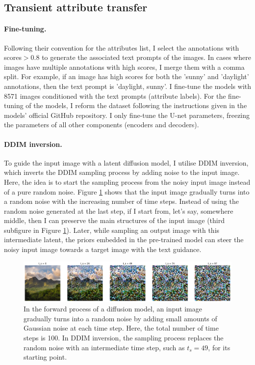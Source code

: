 \subsection{Transient attribute transfer}
\paragraph{Fine-tuning.} Following their convention for the attributes list, I select the annotations with scores$ > 0.8$ to generate the associated text prompts of the images. In cases where images have multiple annotations with high scores, I merge them with a comma split. For example, if an image has high scores for both the 'sunny' and 'daylight' annotations, then the text prompt is 'daylight, sunny'. I fine-tune the models with  8571 images conditioned with the text prompts (attribute labels). For the fine-tuning of the models, I reform the dataset following the instructions given in the models' official GitHub repository. I only fine-tune the U-net parameters, freezing the parameters of all other components (encoders and decoders). 

\paragraph{DDIM inversion.} To guide the input image with a latent diffusion model, I utilise \gls{DDIM} inversion, which inverts the DDIM sampling process by adding noise to the input image. Here, the idea is to start the sampling process from the noisy input image instead of a pure random noise. Figure \ref{fig:ddim-inversion} shows that the input image gradually turns into a random noise with the increasing number of time steps. Instead of using the random noise generated at the last step, if I start from, let's say, somewhere middle, then I can preserve the main structures of the input image (third subfigure in Figure \ref{fig:ddim-inversion}). Later, while sampling an output image with this intermediate latent, the priors embedded in the pre-trained model can steer the noisy input image towards a target image with the text guidance.

\begin{figure}[ht]
  \includegraphics[width=\textwidth]{Chapters/zero-shot-tat-figs/DDIM_forward.png}
  \caption{In the forward process of a diffusion model, an input image gradually turns into a random noise by adding small amounts of Gaussian noise at each time step. Here, the total number of time steps is 100. In DDIM inversion, the sampling process replaces the random noise with an intermediate time step, such as $t_s = 49$, for its starting point.}
  \label{fig:ddim-inversion}
\end{figure}

